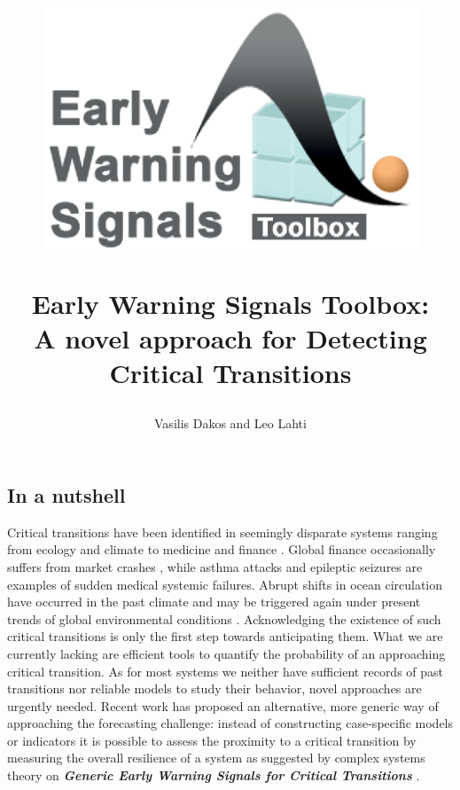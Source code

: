 \documentclass[12pt,a4paper,final]{article}
\author{Vasilis Dakos and Leo Lahti}
\title{
\begin{figure}[h]
\includegraphics[scale=0.55]{logoEWS.eps}
\end{figure}
Early Warning Signals Toolbox:\\ 
A novel approach for Detecting Critical Transitions
}
\begin{document}
\maketitle

\begin{doublespacing}

\section{In a nutshell} %

Critical transitions have been identified in seemingly disparate systems ranging from ecology and climate to medicine and finance \cite{Scheffer2001a,Scheffer2012}. Global finance occasionally suffers from market crashes \cite{May2008}, while asthma attacks \cite{Venegas2005} and epileptic seizures \cite{McSharry2003,Kramer2012} are examples of sudden medical systemic failures. Abrupt shifts in ocean circulation have occurred in the past climate \cite{Rahmstorf2002} and may be triggered again under present trends of global environmental conditions \cite{Lenton2011}.
Acknowledging the existence of such critical transitions is only the first step towards anticipating them. What we are currently lacking are efficient tools to quantify the probability of an approaching critical transition. As for most systems we neither have sufficient records of past transitions nor reliable models to study their behavior, novel approaches are urgently needed. Recent work has proposed an alternative, more generic way of approaching the forecasting challenge: instead of constructing case-specific models or indicators it is possible to assess the proximity to a critical transition by measuring the overall resilience of a system as suggested by complex systems theory on \textit{\textbf{Generic Early Warning Signals for Critical Transitions}} \cite{Scheffer2009a}.\\
\\
\\


\end{doublespacing}
\end{document}
